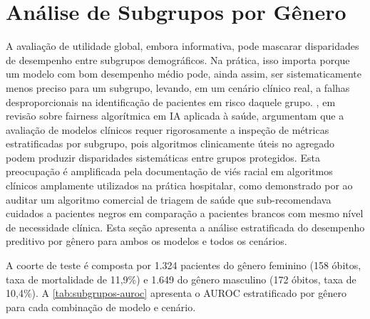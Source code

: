 \section{Análise de Subgrupos por Gênero}
\label{sec:resultados-subgrupos}

A avaliação de utilidade global, embora informativa, pode mascarar disparidades de desempenho entre subgrupos demográficos. Na prática, isso importa porque um modelo com bom desempenho médio pode, ainda assim, ser sistematicamente menos preciso para um subgrupo, levando, em um cenário clínico real, a falhas desproporcionais na identificação de pacientes em risco daquele grupo. , em revisão sobre fairness algorítmica em IA aplicada à saúde, argumentam que a avaliação de modelos clínicos requer rigorosamente a inspeção de métricas estratificadas por subgrupo, pois algoritmos clinicamente úteis no agregado podem produzir disparidades sistemáticas entre grupos protegidos. Esta preocupação é amplificada pela documentação de viés racial em algoritmos clínicos amplamente utilizados na prática hospitalar, como demonstrado por  ao auditar um algoritmo comercial de triagem de saúde que sub-recomendava cuidados a pacientes negros em comparação a pacientes brancos com mesmo nível de necessidade clínica. Esta seção apresenta a análise estratificada do desempenho preditivo por gênero para ambos os modelos e todos os cenários.

A coorte de teste é composta por 1.324 pacientes do gênero feminino (158 óbitos, taxa de mortalidade de 11,9\%) e 1.649 do gênero masculino (172 óbitos, taxa de 10,4\%). A \autoref{tab:subgrupos-auroc} apresenta o AUROC estratificado por gênero para cada combinação de modelo e cenário.

\begin{table}[ht]
\centering
\caption{AUROC por gênero, cenário e arquitetura}
\label{tab:subgrupos-auroc}
\setlength{\tabcolsep}{3pt}
\end{table}

